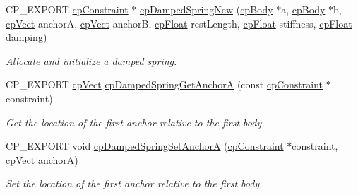 \begin{DoxyCompactItemize}
\mbox{\label{group__cp_damped_spring_ga45dfd1bbe9dded28549c2edfd8c1a059}} 
C\+P\+\_\+\+E\+X\+P\+O\+RT \mbox{\hyperlink{structcp_constraint}{cp\+Constraint}} $\ast$ \mbox{\hyperlink{group__cp_damped_spring_ga45dfd1bbe9dded28549c2edfd8c1a059}{cp\+Damped\+Spring\+New}} (\mbox{\hyperlink{structcp_body}{cp\+Body}} $\ast$a, \mbox{\hyperlink{structcp_body}{cp\+Body}} $\ast$b, \mbox{\hyperlink{structcp_vect}{cp\+Vect}} anchorA, \mbox{\hyperlink{structcp_vect}{cp\+Vect}} anchorB, \mbox{\hyperlink{group__basic_types_gac1ed65573e035bf892505768c852d8d3}{cp\+Float}} rest\+Length, \mbox{\hyperlink{group__basic_types_gac1ed65573e035bf892505768c852d8d3}{cp\+Float}} stiffness, \mbox{\hyperlink{group__basic_types_gac1ed65573e035bf892505768c852d8d3}{cp\+Float}} damping)
\begin{DoxyCompactList}\small\item\em Allocate and initialize a damped spring. \end{DoxyCompactList}\item 
\mbox{\label{group__cp_damped_spring_ga6f5deb6e293c3e13130662f234ee475e}} 
C\+P\+\_\+\+E\+X\+P\+O\+RT \mbox{\hyperlink{structcp_vect}{cp\+Vect}} \mbox{\hyperlink{group__cp_damped_spring_ga6f5deb6e293c3e13130662f234ee475e}{cp\+Damped\+Spring\+Get\+AnchorA}} (const \mbox{\hyperlink{structcp_constraint}{cp\+Constraint}} $\ast$constraint)
\begin{DoxyCompactList}\small\item\em Get the location of the first anchor relative to the first body. \end{DoxyCompactList}\item 
\mbox{\label{group__cp_damped_spring_gaf096f034a491fc3745ed0324fa1c0cf0}} 
C\+P\+\_\+\+E\+X\+P\+O\+RT void \mbox{\hyperlink{group__cp_damped_spring_gaf096f034a491fc3745ed0324fa1c0cf0}{cp\+Damped\+Spring\+Set\+AnchorA}} (\mbox{\hyperlink{structcp_constraint}{cp\+Constraint}} $\ast$constraint, \mbox{\hyperlink{structcp_vect}{cp\+Vect}} anchorA)
\begin{DoxyCompactList}\small\item\em Set the location of the first anchor relative to the first body. \end{DoxyCompactList}\item 
\mbox{\label{group__cp_damped_spring_gaa6cf571d70ab369a6c4068df420a00f1}} 

\end{DoxyCompactItemize}
